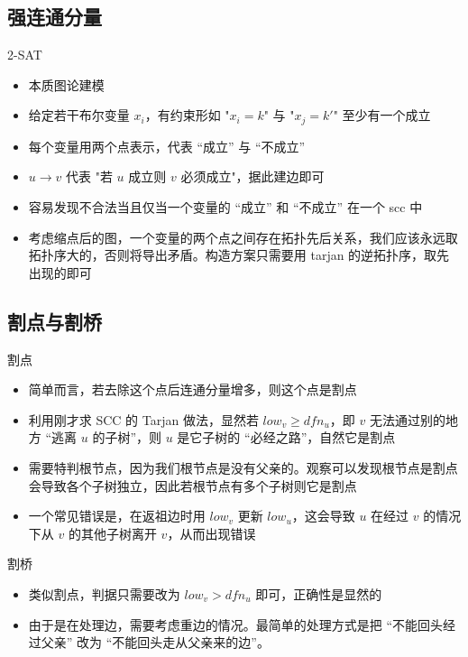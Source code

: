 ﻿\documentclass[aspectratio=169]{ctexbeamer}
\begin{document}
\subsection{强连通分量}
\begin{frame}{2-SAT}
    \begin{itemize}
        \item 本质图论建模
        \item 给定若干布尔变量 $x_i$，有约束形如 "$x_i=k$" 与 "$x_j=k'$" 至少有一个成立
        \item 每个变量用两个点表示，代表 “成立” 与 “不成立”
        \item $u\to v$ 代表 "若 $u$ 成立则 $v$ 必须成立"，据此建边即可
        \item 容易发现不合法当且仅当一个变量的 “成立” 和 “不成立” 在一个 scc 中
        \item 考虑缩点后的图，一个变量的两个点之间存在拓扑先后关系，我们应该永远取拓扑序大的，否则将导出矛盾。构造方案只需要用 tarjan 的逆拓扑序，取先出现的即可
    \end{itemize}
\end{frame}

\subsection{割点与割桥}
\begin{frame}{割点}
    \begin{itemize}
        \item 简单而言，若去除这个点后连通分量增多，则这个点是割点
        \item 利用刚才求 SCC 的 Tarjan 做法，显然若 $low_v\ge dfn_u$，即 $v$ 无法通过别的地方 “逃离 $u$ 的子树”，则 $u$ 是它子树的 “必经之路”，自然它是割点
        \item 需要特判根节点，因为我们根节点是没有父亲的。观察可以发现根节点是割点会导致各个子树独立，因此若根节点有多个子树则它是割点
        \item 一个常见错误是，在返祖边时用 $low_v$ 更新 $low_u$，这会导致 $u$ 在经过 $v$ 的情况下从 $v$ 的其他子树离开 $v$，从而出现错误
    \end{itemize}
\end{frame}

\begin{frame}{割桥}
    \begin{itemize}
        \item 类似割点，判据只需要改为 $low_v>dfn_u$ 即可，正确性是显然的
        \item 由于是在处理边，需要考虑重边的情况。最简单的处理方式是把 “不能回头经过父亲” 改为 “不能回头走从父亲来的边”。
    \end{itemize}
\end{frame}
\end{document}
